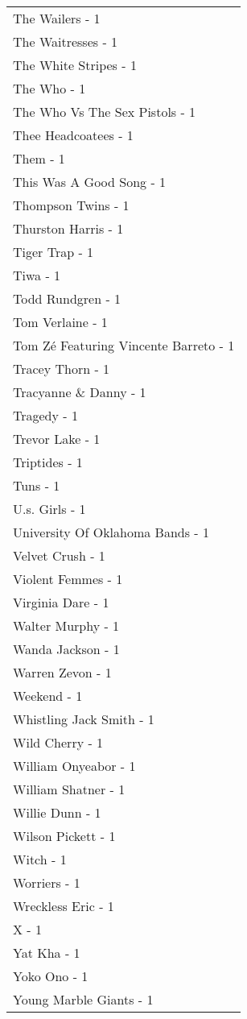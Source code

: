 \documentclass[
]{article}
\begin{document}
\begin{longtable}{l}
The Wailers - 1 \\ 
The Waitresses - 1 \\ 
The White Stripes - 1 \\ 
The Who - 1 \\ 
The Who Vs The Sex Pistols - 1 \\ 
Thee Headcoatees - 1 \\ 
Them - 1 \\ 
This Was A Good Song - 1 \\ 
Thompson Twins - 1 \\ 
Thurston Harris - 1 \\ 
Tiger Trap - 1 \\ 
Tiwa - 1 \\ 
Todd Rundgren - 1 \\ 
Tom Verlaine - 1 \\ 
Tom Zé Featuring Vincente Barreto - 1 \\ 
Tracey Thorn - 1 \\ 
Tracyanne \& Danny - 1 \\ 
Tragedy - 1 \\ 
Trevor Lake - 1 \\ 
Triptides - 1 \\ 
Tuns - 1 \\ 
U.s. Girls - 1 \\ 
University Of Oklahoma Bands - 1 \\ 
Velvet Crush - 1 \\ 
Violent Femmes - 1 \\ 
Virginia Dare - 1 \\ 
Walter Murphy - 1 \\ 
Wanda Jackson - 1 \\ 
Warren Zevon - 1 \\ 
Weekend - 1 \\ 
Whistling Jack Smith - 1 \\ 
Wild Cherry - 1 \\ 
William Onyeabor - 1 \\ 
William Shatner - 1 \\ 
Willie Dunn - 1 \\ 
Wilson Pickett - 1 \\ 
Witch - 1 \\ 
Worriers - 1 \\ 
Wreckless Eric - 1 \\ 
X - 1 \\ 
Yat Kha - 1 \\ 
Yoko Ono - 1 \\ 
Young Marble Giants - 1 \\ 

\end{longtable}
\end{document}
